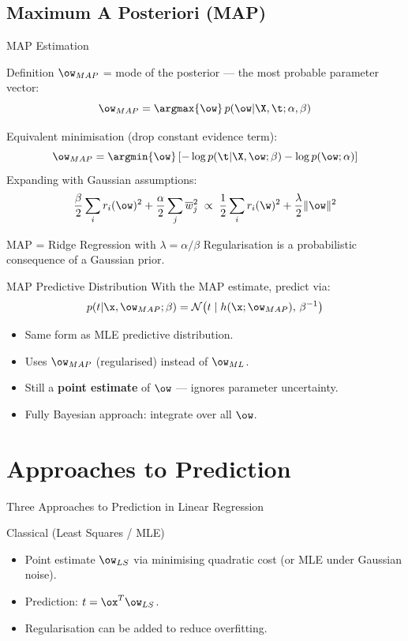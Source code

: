 \subsection{Maximum A Posteriori (MAP)}

\begin{frame}{MAP Estimation}
  \begin{block}{Definition}
    $\ow_{MAP}$ = \alert{mode} of the posterior — the most probable parameter vector:
    \[
      \ow_{MAP} = \argmax{\ow}\,p(\ow|\X,\t;\alpha,\beta)
    \]
  \end{block}
  Equivalent minimisation (drop constant evidence term):
  \[
    \ow_{MAP} = \argmin{\ow}\left[-\log p(\t|\X,\ow;\beta) - \log p(\ow;\alpha)\right]
  \]
  Expanding with Gaussian assumptions:
  \[
    \frac{\beta}{2}\sum_i r_i(\ow)^2 + \frac{\alpha}{2}\sum_j\overline{w}_j^2
    \;\propto\;
    \frac{1}{2}\sum_i r_i(\w)^2 + \frac{\lambda}{2}\|\ow\|^2
  \]
  \begin{alertblock}{MAP = Ridge Regression with $\lambda = \alpha/\beta$}
    Regularisation is a \alert{probabilistic} consequence of a Gaussian prior.
  \end{alertblock}
\end{frame}

\begin{frame}{MAP Predictive Distribution}
  With the MAP estimate, predict via:
  \[
    p(t|\x,\ow_{MAP};\beta) = \mathcal{N}\bigl(t\mid h(\x;\ow_{MAP}),\,\beta^{-1}\bigr)
  \]
  \begin{itemize}
    \item Same form as MLE predictive distribution.
    \item Uses $\ow_{MAP}$ (regularised) instead of $\ow_{ML}$.
    \item Still a \textbf{point estimate} of $\ow$ — ignores parameter uncertainty.
    \item Fully Bayesian approach: integrate over all $\ow$.
  \end{itemize}
\end{frame}

\section{Approaches to Prediction}

\begin{frame}{Three Approaches to Prediction in Linear Regression}
  \begin{block}{Classical (Least Squares / MLE)}
    \begin{itemize}
      \item Point estimate $\ow_{LS}$ via minimising quadratic cost (or MLE under Gaussian noise).
      \item Prediction: $t = \ox^T\ow_{LS}$.
      \item Regularisation can be added to reduce overfitting.
    \end{itemize}
  \end{block}
\end{frame}

